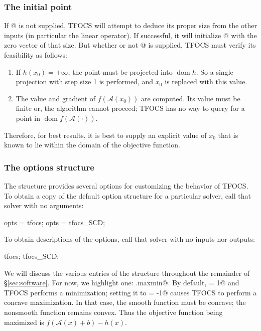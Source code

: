 \documentclass{article}
\newcommand{\cA}{\ensuremath{\mathcal{A}}}    %
\newcommand{\<}{\langle}
\renewcommand{\>}{\rangle}
\newcommand\dom{\operatorname{\textrm{dom}}}
\begin{document}
\subsubsection{The initial point}

If @ is not supplied, TFOCS will attempt to deduce its
proper size from the other inputs (in particular the linear operator).
If successful, it will initialize @ with the zero vector of
that size. But whether or not @ is supplied, TFOCS must
verify its feasibility as follows:
\begin{enumerate}
\item If $h(x_0)=+\infty$,
the point must be projected into $\dom h$. So a single projection
with step size 1 is performed, and $x_0$ is replaced with this value.
\item The value and gradient of $f(\cA(x_0))$ are computed. Its value
must be finite or, the algorithm cannot proceed; TFOCS
has no way to query for a point in $\dom f(\cA(\cdot))$.
\end{enumerate}
Therefore, for best results, it is best to supply an explicit value
of $x_0$ that is known to lie within the domain of the objective function.

\subsubsection{The options structure}\label{sec:opts}

The \verb@opts@ structure provides several options for customizing
the behavior of TFOCS. To obtain a copy of the default option structure
for a particular solver, call that solver with no arguments:
\begin{code}
	opts = tfocs;
	opts = tfocs_SCD;
\end{code}
To obtain descriptions of the options, call that solver with no inputs nor outputs:
\begin{code}
	tfocs;
	tfocs_SCD;
\end{code}

We will discuss the various entries of the \verb@opts@ structure
throughout the remainder of \S\ref{sec:software}. For now,
we highlight one: \verb@opts.maxmin@. By default, \verb@maxmin = 1@
and TFOCS performs a minimization; setting it to \verb@maxmin = -1@
causes TFOCS to perform a concave maximization. In that case,
the smooth function \verb@smoothF@ must be concave; the nonsmooth
function \verb@nonsmoothF@ remains convex. Thus the objective 
function being maximized is $f(\cA(x)+b)-h(x)$.
\end{document}

